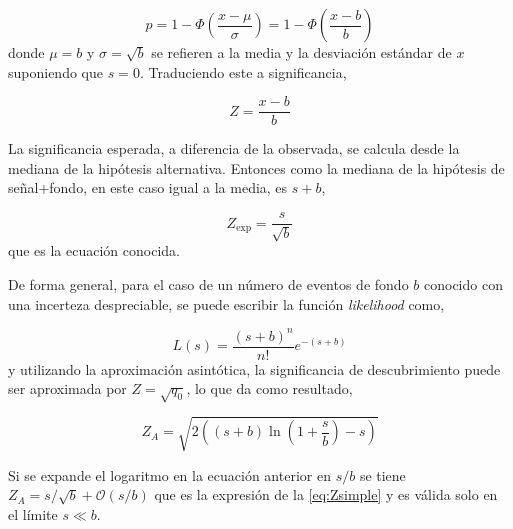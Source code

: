 \begin{equation}
  p = 1 - \Phi \left( \frac{x-\mu}{\sigma} \right) = 1 - \Phi \left(
  \frac{x-b}{b} \right)
\end{equation}
%
donde $\mu=b$ y $\sigma = \sqrt{b}$ se refieren a la media y la desviación
estándar de $x$ suponiendo que $s=0$. Traduciendo este {\pvalue} a significancia,

\begin{equation}
  Z = \frac{x-b}{b}
\end{equation}

La significancia esperada, a diferencia de la observada, se calcula desde la mediana
de la hipótesis alternativa. Entonces como la mediana de la hipótesis de señal+fondo,
en este caso igual a la media, es $s+b$,

\begin{equation}
  Z_\text{exp} = \frac{s}{\sqrt{b}}
  \label{eq:Zsimple}
\end{equation}
%
que es la ecuación conocida.

De forma general, para el caso de un número de eventos de fondo $b$ conocido con
una incerteza despreciable, se puede escribir la función \emph{likelihood} como,

\begin{equation}
  L(s) = \frac{(s+b)^n}{n!} e^{-(s+b)}
\end{equation}
%
y utilizando la aproximación asintótica, la significancia de descubrimiento
puede ser aproximada por $Z=\sqrt{q_0}$, lo que da como resultado,

%

\begin{equation}
  Z_A = \sqrt{2\left( (s+b) \ln \left( 1 + \frac{s}{b}\right) - s \right)}
  \label{eq:Z}
\end{equation}

Si se expande el logaritmo en la ecuación anterior en $s/b$ se tiene $Z_A =
s/\sqrt{b} + \mathcal{O}(s/b)$ que es la expresión de la \cref{eq:Zsimple}
y es válida solo en el límite $s \ll b$.

